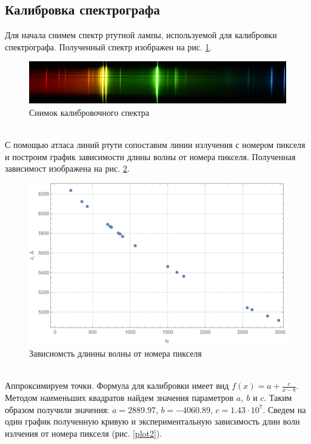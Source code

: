\documentclass[a4paper, 12pt]{article}
\begin{document}
\subsection{Калибровка спектрографа}
Для начала снимем спектр ртутной лампы, используемой для калибровки спектрографа. Полученный спектр изображен на рис. \ref{hg_spec}.
\begin{figure}[!htb]
	\centering
	\includegraphics[width=\textwidth]{hg_lamp.png}
	\caption{Снимок калибровочного спектра}
	\label{hg_spec}
\end{figure}\\
С помощью атласа линий ртути сопоставим линии излучения с номером пикселя и построим график зависимости длины волны от номера пикселя. Полученная зависимост изображена на рис. \ref{plot1}.
\begin{figure}[!htb]
	\centering
	\includegraphics[scale=0.7]{plot1.pdf}
	\caption{Зависиомсть длинны волны от номера пикселя}
	\label{plot1}
\end{figure}\\
Аппроксимируем точки. Формула для калибровки имеет вид $f(x)=a+\frac{c}{x-b}$. Методом наименьших квадратов найдем значения параметров $a,\ b$ и $c$. Таким образом получили значения: $a=2889.97$, $b= -4060.89$, $c=1.43\cdot10^7$. Сведем на один график полученную кривую и экспериментальную зависимость длин волн излчения от номера пикселя (рис. \ref{plot2}).
\end{document}

